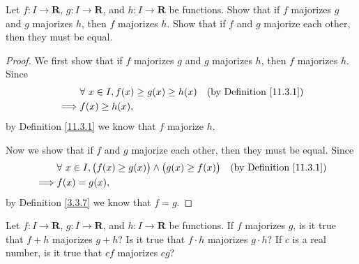 \exercisesection

\begin{exercise}\label{ex 11.3.1}
    Let \(f : I \to \mathbf{R}\), \(g : I \to \mathbf{R}\), and \(h : I \to \mathbf{R}\) be functions.
    Show that if \(f\) majorizes \(g\) and \(g\) majorizes \(h\), then \(f\) majorizes \(h\).
    Show that if \(f\) and \(g\) majorize each other, then they must be equal.
\end{exercise}

\begin{proof}
    We first show that if \(f\) majorizes \(g\) and \(g\) majorizes \(h\), then \(f\) majorizes \(h\).
    Since
    \begin{align*}
                 & \forall\ x \in I, f(x) \geq g(x) \geq h(x) & \text{(by Definition \ref{11.3.1})} \\
        \implies & f(x) \geq h(x),
    \end{align*}
    by Definition \ref{11.3.1} we know that \(f\) majorize \(h\).

    Now we show that if \(f\) and \(g\) majorize each other, then they must be equal.
    Since
    \begin{align*}
                 & \forall\ x \in I, \big(f(x) \geq g(x)\big) \land \big(g(x) \geq f(x)\big) & \text{(by Definition \ref{11.3.1})} \\
        \implies & f(x) = g(x),
    \end{align*}
    by Definition \ref{3.3.7} we know that \(f = g\).
\end{proof}

\begin{exercise}\label{ex 11.3.2}
    Let \(f : I \to \mathbf{R}\), \(g : I \to \mathbf{R}\), and \(h : I \to \mathbf{R}\) be functions.
    If \(f\) majorizes \(g\), is it true that \(f + h\) majorizes \(g + h\)?
    Is it true that \(f \cdot h\) majorizes \(g \cdot h\)?
    If \(c\) is a real number, is it true that \(cf\) majorizes \(cg\)?
\end{exercise}

